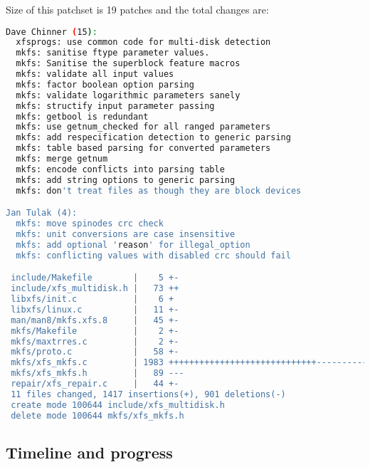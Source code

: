 Size of this patchset is 19 patches and the total changes are:
\begin{lstlisting}[frame=none, basicstyle=\footnotesize\ttfamily, language=Bash, numbers=none, numberstyle=\tiny\color{black},caption= {Git statistics for the first patchset~\cite{finalPatchset1}. Note: Git attributes changes only to the first author of each commit.}]
Dave Chinner (15):
  xfsprogs: use common code for multi-disk detection
  mkfs: sanitise ftype parameter values.
  mkfs: Sanitise the superblock feature macros
  mkfs: validate all input values
  mkfs: factor boolean option parsing
  mkfs: validate logarithmic parameters sanely
  mkfs: structify input parameter passing
  mkfs: getbool is redundant
  mkfs: use getnum_checked for all ranged parameters
  mkfs: add respecification detection to generic parsing
  mkfs: table based parsing for converted parameters
  mkfs: merge getnum
  mkfs: encode conflicts into parsing table
  mkfs: add string options to generic parsing
  mkfs: don't treat files as though they are block devices

Jan Tulak (4):
  mkfs: move spinodes crc check
  mkfs: unit conversions are case insensitive
  mkfs: add optional 'reason' for illegal_option
  mkfs: conflicting values with disabled crc should fail

 include/Makefile        |    5 +-
 include/xfs_multidisk.h |   73 ++
 libxfs/init.c           |    6 +
 libxfs/linux.c          |   11 +-
 man/man8/mkfs.xfs.8     |   45 +-
 mkfs/Makefile           |    2 +-
 mkfs/maxtrres.c         |    2 +-
 mkfs/proto.c            |   58 +-
 mkfs/xfs_mkfs.c         | 1983 +++++++++++++++++++++++++++++------------------
 mkfs/xfs_mkfs.h         |   89 ---
 repair/xfs_repair.c     |   44 +-
 11 files changed, 1417 insertions(+), 901 deletions(-)
 create mode 100644 include/xfs_multidisk.h
 delete mode 100644 mkfs/xfs_mkfs.h
\end{lstlisting}

\subsection{Timeline and progress}

